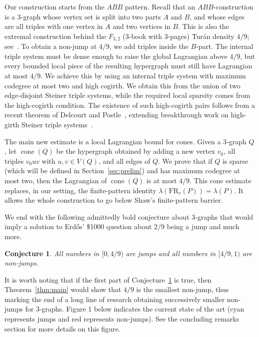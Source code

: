 \documentclass[10pt]{article}
\numberwithin{equation}{section}
\newtheorem{conjecture}[theorem]{Conjecture}
\theoremstyle{definition}
\theoremstyle{remark}
\newcommand{\cone}{\operatorname{cone}}
\begin{document}
Our construction starts from the $ABB$ pattern. Recall that an $ABB$-construction is a $3$-graph whose vertex set is split into two parts $A$ and $B$, and whose edges are all triples with one vertex in $A$ and two vertices in $B$.
This is also the extremal construction behind the $F_{3,2}$ ($3$-book with $3$-pages) Tur\'an density $4/9$; see~\cite{MubayiRodl02,FurediPikhurkoSimonovits03}.
To obtain a non-jump at $4/9$, we add triples inside the $B$-part.  The internal triple system must be dense enough to raise the global Lagrangian above $4/9$, but every bounded local piece of the resulting hypergraph must still have Lagrangian at most $4/9$.  We achieve this by using an internal triple system with maximum codegree at most two and high cogirth.  We obtain this from the union of two edge-disjoint Steiner triple systems, while the required local sparsity comes from the high-cogirth condition.  The existence of such high-cogirth pairs follows from a recent theorem of Delcourt and Postle~\cite[Theorem~3.3]{DelcourtPostle24}, extending breakthrough work on high-girth Steiner triple systems~\cite{BW19,GlockKuhnLoOsthus20,KwanSahSawhneySimkin24}.

The main new estimate is a local Lagrangian bound for cones.  Given a $3$-graph $Q$, let $\cone(Q)$ be the hypergraph obtained by adding a new vertex $v_0$, all triples $v_0uv$ with $u,v\in V(Q)$, and all edges of $Q$.  We prove that if $Q$ is sparse (which will be defined in Section~\ref{sec:prelim}) and has maximum codegree at most two, then the Lagrangian of $\cone(Q)$ is at most $4/9$. This cone estimate replaces, in our setting, the finite-pattern identity $\lambda(\mathrm{FR}_v(P))=\lambda(P)$.  It allows the whole construction to go below Shaw's finite-pattern barrier.

We end with the following admittedly bold conjecture about 3-graphs that would imply a solution to Erd\H{o}s' \$1000 question about 2/9 being a jump and much more.

\begin{conjecture} \label{conj:4/9}
   All numbers in $[0,4/9)$ are jumps and all numbers in $[4/9, 1)$ are non-jumps.
   \end{conjecture}
It is worth noting that if the first part of Conjecture~\ref{conj:4/9} is true, then Theorem~\ref{thm:main} would show that $4/9$ is the smallest non-jump, thus marking the end of a long line of research obtaining successively smaller non-jumps for 3-graphs. Figure 1 below indicates the current state of the art (cyan represents jumps and red represents non-jumps). See the concluding remarks section for more details on this figure.
\end{document}
